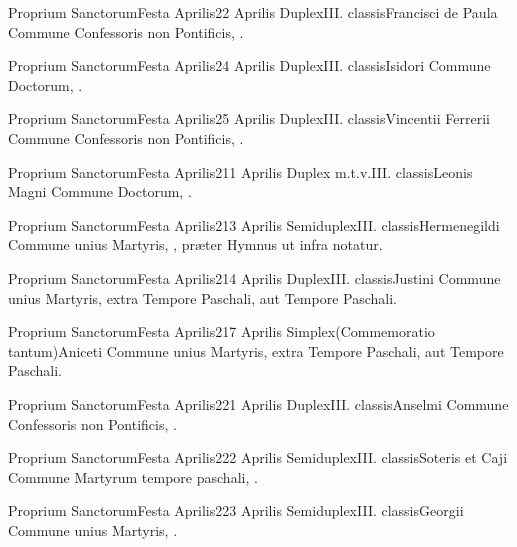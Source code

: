 \documentclass[nocturnale-romanum.tex]{subfiles}
\begin{document}

	{Proprium Sanctorum}{Festa Aprilis}{2}{2 Aprilis}
	{Duplex}{III. classis}{Francisci de Paula}
	{Commune Confessoris non Pontificis, \pageref{M-CONP}.}
	{}

	{Proprium Sanctorum}{Festa Aprilis}{2}{4 Aprilis}
	{Duplex}{III. classis}{Isidori}
	{Commune Doctorum, \pageref{M-CODO}.}
	{}

	{Proprium Sanctorum}{Festa Aprilis}{2}{5 Aprilis}
	{Duplex}{III. classis}{Vincentii Ferrerii}
	{Commune Confessoris non Pontificis, \pageref{M-CONP}.}
	{}

	{Proprium Sanctorum}{Festa Aprilis}{2}{11 Aprilis}
	{Duplex m.t.v.}{III. classis}{Leonis Magni}
	{Commune Doctorum, \pageref{M-CODO}.}
	{}

	{Proprium Sanctorum}{Festa Aprilis}{2}{13 Aprilis}
	{Semiduplex}{III. classis}{Hermenegildi}
	{Commune unius Martyris, \pageref{M-UMEX}, præter Hymnus ut infra notatur.}
	{}

	{Proprium Sanctorum}{Festa Aprilis}{2}{14 Aprilis}
	{Duplex}{III. classis}{Justini}
	{Commune unius Martyris, \pageref{M-UMEX} extra Tempore Paschali, aut \pageref{M-MRTP} Tempore Paschali.}
	{}

	{Proprium Sanctorum}{Festa Aprilis}{2}{17 Aprilis}
	{Simplex}{(Commemoratio tantum)}{Aniceti}
	{Commune unius Martyris, \pageref{M-UMEX} extra Tempore Paschali, aut \pageref{M-MRTP} Tempore Paschali.}
	{}

	{Proprium Sanctorum}{Festa Aprilis}{2}{21 Aprilis}
	{Duplex}{III. classis}{Anselmi}
	{Commune Confessoris non Pontificis, \pageref{M-CONP}.}
	{}

	{Proprium Sanctorum}{Festa Aprilis}{2}{22 Aprilis}
	{Semiduplex}{III. classis}{Soteris et Caji}
	{Commune Martyrum tempore paschali, \pageref{M-MRTP}.}
	{}

	{Proprium Sanctorum}{Festa Aprilis}{2}{23 Aprilis}
	{Semiduplex}{III. classis}{Georgii}
	{Commune unius Martyris, \pageref{M-MRTP}.}
	{}
\end{document}
